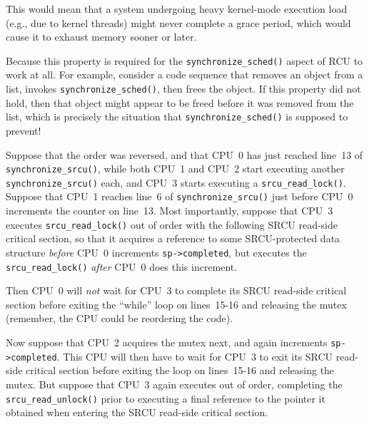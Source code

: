 
This would mean that a system undergoing heavy kernel-mode execution load
(e.g., due to kernel threads) might never complete a grace period, which
would cause it to exhaust memory sooner or later.


	Because this property is required for the {\tt synchronize\_sched()}
	aspect of RCU to work at all.
	For example, consider a code sequence that removes an object
	from a list, invokes {\tt synchronize\_sched()}, then frees
	the object.
	If this property did not hold, then that object might appear
	to be freed before it was
	removed from the list, which is precisely the situation that
	{\tt synchronize\_sched()} is supposed to prevent!


	Suppose that the order was reversed, and that CPU~0
	has just reached line~13 of
	{\tt synchronize\_srcu()}, while both CPU~1 and CPU~2 start executing
	another {\tt synchronize\_srcu()} each, and CPU~3 starts executing a
	{\tt srcu\_read\_lock()}.
	Suppose that CPU~1 reaches line~6 of {\tt synchronize\_srcu()}
	just before CPU~0 increments the counter on line~13.
	Most importantly, suppose that
	CPU~3 executes {\tt srcu\_read\_lock()}
	out of order with the following SRCU read-side critical section,
	so that it acquires a reference to some SRCU-protected data
	structure \emph{before} CPU~0 increments {\tt sp->completed}, but
	executes the {\tt srcu\_read\_lock()} \emph{after} CPU~0 does
	this increment.
	
	Then CPU~0 will \emph{not} wait for CPU~3 to complete its
	SRCU read-side critical section before exiting the ``while''
	loop on lines~15-16 and releasing the mutex (remember, the
	CPU could be reordering the code).
	
	Now suppose that CPU~2 acquires the mutex next,
	and again increments {\tt sp->completed}.
	This CPU will then have to wait for CPU~3 to exit its SRCU
	read-side critical section before exiting the loop on
	lines~15-16 and releasing the mutex.
	But suppose that CPU~3 again executes out of order,
	completing the {\tt srcu\_read\_unlock()} prior to
	executing a final reference to the pointer it obtained
	when entering the SRCU read-side critical section.

